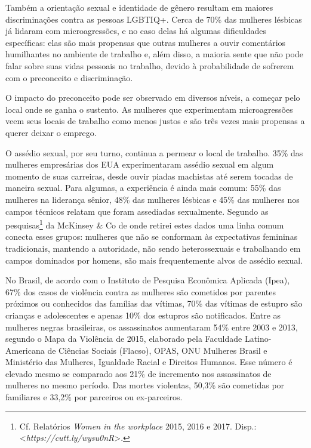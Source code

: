 Também a orientação sexual e identidade de gênero resultam em maiores
discriminações contra as pessoas LGBTIQ+. Cerca de 70\% das mulheres
lésbicas já lidaram com microagressões, e no caso delas há algumas
dificuldades específicas: elas são mais propensas que outras mulheres a
ouvir comentários humilhantes no ambiente de trabalho e, além disso, a
maioria sente que não pode falar sobre suas vidas pessoais no trabalho,
devido à probabilidade de sofrerem com o preconceito e discriminação.

O impacto do preconceito pode ser observado em diversos níveis, a
começar pelo local onde se ganha o sustento. As mulheres que
experimentam microagressões veem seus locais de trabalho como menos
justos e são três vezes mais propensas a querer deixar o emprego.

O assédio sexual, por seu turno, continua a permear o local de trabalho.
35\% das mulheres empresárias dos EUA experimentaram assédio sexual em
algum momento de suas carreiras, desde ouvir piadas machistas até serem
tocadas de maneira sexual. Para algumas, a experiência é ainda mais
comum: 55\% das mulheres na liderança sênior, 48\% das mulheres lésbicas
e 45\% das mulheres nos campos técnicos relatam que foram assediadas
sexualmente. Segundo as pesquisas\footnote{Cf. Relatórios \emph{Women in
  the workplace} 2015, 2016 e 2017. Disp.:
  \textless{}\emph{https://cutt.ly/wysu0nR}\textgreater{}.} da McKinsey \& Co de onde
retirei estes dados uma linha comum conecta esses grupos: mulheres que
não se conformam às expectativas femininas tradicionais, mantendo a
autoridade, não sendo heterossexuais e trabalhando em campos dominados
por homens, são mais frequentemente alvos de assédio sexual.

No Brasil, de acordo com o Instituto de Pesquisa Econômica Aplicada
(Ipea), 67\% dos casos de violência contra as mulheres são cometidos por
parentes próximos ou conhecidos das famílias das vítimas, 70\% das
vítimas de estupro são crianças e adolescentes e apenas 10\% dos
estupros são notificados. Entre as mulheres negras brasileiras, os
assassinatos aumentaram 54\% entre 2003 e 2013, segundo o Mapa da
Violência de 2015, elaborado pela Faculdade Latino-Americana de Ciências
Sociais (Flacso), OPAS, ONU Mulheres Brasil e Ministério das Mulheres,
Igualdade Racial e Direitos Humanos. Esse número é elevado mesmo se
comparado aos 21\% de incremento nos assassinatos de mulheres no mesmo
período. Das mortes violentas, 50,3\% são cometidas por familiares e
33,2\% por parceiros ou ex-parceiros.

